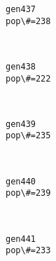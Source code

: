 \documentclass[11pt]{article}
\begin{document}
    \begin{Verbatim}[commandchars=\\\{\}]
gen437
pop\#=238

    \end{Verbatim}

    \begin{center}
    \end{center}
    { \hspace*{\fill} \\}
    
    \begin{Verbatim}[commandchars=\\\{\}]
gen438
pop\#=222

    \end{Verbatim}

    \begin{center}
    \end{center}
    { \hspace*{\fill} \\}
    
    \begin{Verbatim}[commandchars=\\\{\}]
gen439
pop\#=235

    \end{Verbatim}

    \begin{center}
    \end{center}
    { \hspace*{\fill} \\}
    
    \begin{Verbatim}[commandchars=\\\{\}]
gen440
pop\#=239

    \end{Verbatim}

    \begin{center}
    \end{center}
    { \hspace*{\fill} \\}
    
    \begin{Verbatim}[commandchars=\\\{\}]
gen441
pop\#=233

    \end{Verbatim}
\end{document}
